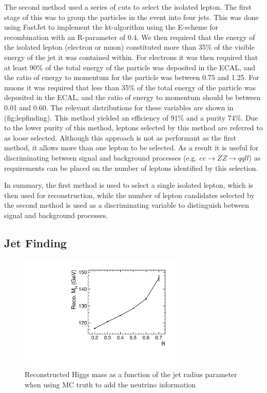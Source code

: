 The second method used a series of cuts to select the isolated lepton. The first stage of this was to group the particles in the event into four jets. This was done using FastJet \cite{Cacciari:2011ma} to implement the kt-algorithm using the E-scheme for recombination with an R-parameter of 0.4. We then required that the energy of the isolated lepton (electron or muon) constituted more than 35\% of the visible energy of the jet it was contained within. For electrons it was then required that at least 90\% of the total energy of the particle was deposited in the ECAL, and the ratio of energy to momentum for the particle was between 0.75 and 1.25. For muons it was required that less than 35\% of the total energy of the particle was deposited in the ECAL, and the ratio of energy to momentum should be between 0.01 and 0.60. The relevant distributions for these variables are shown in (fig:lepfinding). This method yielded an efficiency of 91\% and a purity 74\%. Due to the lower purity of this method, leptons selected by this method are referred to as loose selected. Although this approach is not as performant as the first method, it allows more than one lepton to be selected. As a result it is useful for discriminating between signal and background processes (e.g. $ee\rightarrow ZZ\rightarrow qqll$) as requirements can be placed on the number of leptons identified by this selection.

In summary, the first method is used to select a single isolated lepton, which is then used for reconstruction, while the number of lepton candidates selected by the second method is used as a discriminating variable to distinguish between signal and background processes. 

\subsection{Jet Finding}

\begin{figure}
  \centering
  \includegraphics[width=0.7\textwidth,keepaspectratio]{HiggsAnalysis/figures/HiggsJetOptimization.pdf}
  \caption[Jet Reconstruction Optimization]{Reconstructed Higgs mass as a function of the jet radius parameter when using MC truth to add the neutrino information}
  \label{fig:jetoptimization}
\end{figure}


